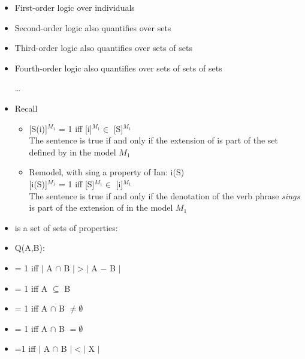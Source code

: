 \documentclass[headrule,footrule]{foils}
\begin{document}
\begin{itemize}
\item First-order logic over individuals
\item Second-order logic also quantifies over sets
\item Third-order logic also quantifies over sets of sets
\item Fourth-order logic also quantifies over sets of sets of sets
\item[\ldots{}]
\end{itemize}



 \begin{itemize}
\item Recall  
  \begin{itemize}
  \item {[S(i)]$^{M_1}$ = 1 iff [i]$^{M_1} \in$ [S]$^{M_1}$} \\ The
    sentence is true if and only if the extension of  is part of
    the set defined by  in the model $M_1$
  \item Remodel, with sing a property of Ian: i(S) \\ {[i(S)]$^{M_1}$
      = 1 iff [S]$^{M_1} \in$ [i]$^{M_1}$} \\ The sentence is true if
    and only if the denotation of the verb phrase \textit{sings} is
    part of the extension of   in the model $M_1$
  \end{itemize}
\item {} is a set of sets of properties: 
\end{itemize}

\begin{itemize}
\item Q(A,B): 
\item {} = 1 iff $|$ A $\cap$ B $| > |$ A $-$ B $|$ 
\item {} = 1 iff  A $\subseteq$ B  
\item {} = 1 iff  A $\cap$ B $\ne \emptyset$ 
\item {} = 1 iff A $\cap$ B  $= \emptyset$ 
\item {} =1 iff $|$ A $\cap$ B $| <  |$ X $|$ 
\end{itemize}

\end{document}

